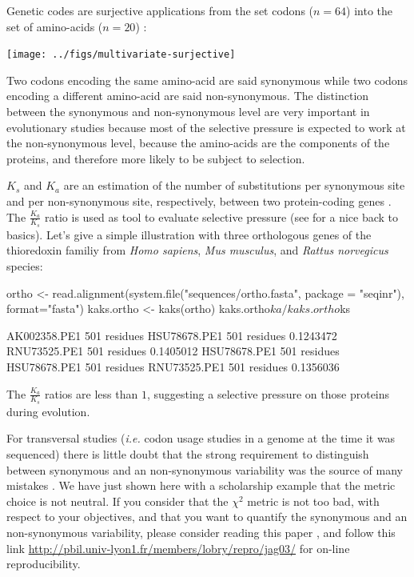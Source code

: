 \documentclass{article}
\begin{document}
Genetic codes are surjective applications from the set codons ($n=64$)
into the set of amino-acids ($n=20$) :

\texttt{[image: ../figs/multivariate-surjective]}

Two codons encoding the same amino-acid are said synonymous while
two codons encoding a different amino-acid are said non-synonymous.
The distinction between the synonymous and non-synonymous level are
very important in evolutionary studies because most of the selective
pressure is expected to work at the non-synonymous level, because the
amino-acids are the components of the proteins, and therefore more likely
to be subject to selection.

$K_s$ and $K_a$ are an estimation of the number of substitutions per synonymous site 
and per non-synonymous site, respectively, between two protein-coding genes \cite{kaks}.
The $\frac{K_{a}}{K_{s}}$ ratio is used as tool to evaluate selective pressure (see \cite{hurst}
for a nice back to basics). Let's give a simple illustration with three orthologous genes of the 
thioredoxin familiy from \textit{Homo sapiens}, \textit{Mus musculus},
and \textit{Rattus norvegicus} species: 

\begin{Schunk}
\begin{Sinput}
 ortho <- read.alignment(system.file("sequences/ortho.fasta", package = "seqinr"), format="fasta")
 kaks.ortho <- kaks(ortho)
 kaks.ortho$ka/kaks.ortho$ks
\end{Sinput}
\begin{Soutput}
                                     AK002358.PE1            501 residues
HSU78678.PE1            501 residues                            0.1243472
RNU73525.PE1            501 residues                            0.1405012
                                     HSU78678.PE1            501 residues
HSU78678.PE1            501 residues                                     
RNU73525.PE1            501 residues                            0.1356036
\end{Soutput}
\end{Schunk}

The  $\frac{K_{a}}{K_{s}}$ ratios are less than $1$, suggesting a selective 
pressure on those proteins during evolution.

For transversal studies (\textit{i.e.} codon usage studies in a genome at the time it was sequenced)
there is little doubt that the strong requirement to distinguish between synonymous and an non-synonymous
variability was the source of many mistakes \cite{misuse}. We have just shown here with a scholarship
example that the metric choice is not neutral. If you consider that the $\chi^{2}$ metric is not too bad,
with respect to your objectives, and that you want to quantify the synonymous and an non-synonymous
variability, please consider reading this paper \cite{lobrychessel}, and follow this link
\url{http://pbil.univ-lyon1.fr/members/lobry/repro/jag03/} for on-line reproducibility.
\end{document}
